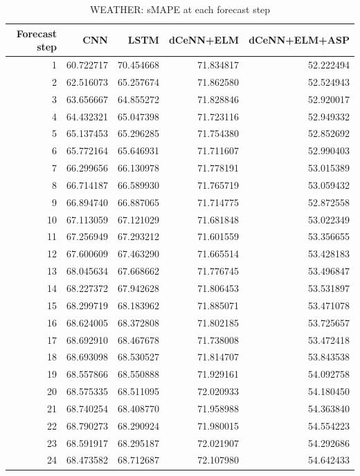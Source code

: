 \begin{table}
\caption{WEATHER: sMAPE at each forecast step}
\begin{tabular}{rrrrr}
\toprule
Forecast step & CNN & LSTM & dCeNN+ELM & dCeNN+ELM+ASP \\
\midrule
1 & 60.722717 & 70.454668 & 71.834817 & 52.222494 \\
2 & 62.516073 & 65.257674 & 71.862580 & 52.524943 \\
3 & 63.656667 & 64.855272 & 71.828846 & 52.920017 \\
4 & 64.432321 & 65.047398 & 71.723116 & 52.949332 \\
5 & 65.137453 & 65.296285 & 71.754380 & 52.852692 \\
6 & 65.772164 & 65.646931 & 71.711607 & 52.990403 \\
7 & 66.299656 & 66.130978 & 71.778191 & 53.015389 \\
8 & 66.714187 & 66.589930 & 71.765719 & 53.059432 \\
9 & 66.894740 & 66.887065 & 71.714775 & 52.872558 \\
10 & 67.113059 & 67.121029 & 71.681848 & 53.022349 \\
11 & 67.256949 & 67.293212 & 71.601559 & 53.356655 \\
12 & 67.600609 & 67.463290 & 71.665514 & 53.428183 \\
13 & 68.045634 & 67.668662 & 71.776745 & 53.496847 \\
14 & 68.227372 & 67.942628 & 71.806453 & 53.531897 \\
15 & 68.299719 & 68.183962 & 71.885071 & 53.471078 \\
16 & 68.624005 & 68.372808 & 71.802185 & 53.725657 \\
17 & 68.692910 & 68.467678 & 71.738008 & 53.472418 \\
18 & 68.693098 & 68.530527 & 71.814707 & 53.843538 \\
19 & 68.557866 & 68.550888 & 71.929161 & 54.092758 \\
20 & 68.575335 & 68.511095 & 72.020933 & 54.180450 \\
21 & 68.740254 & 68.408770 & 71.958988 & 54.363840 \\
22 & 68.790273 & 68.290924 & 71.980015 & 54.554223 \\
23 & 68.591917 & 68.295187 & 72.021907 & 54.292686 \\
24 & 68.473582 & 68.712687 & 72.107980 & 54.642433 \\
\bottomrule
\end{tabular}
\end{table}
